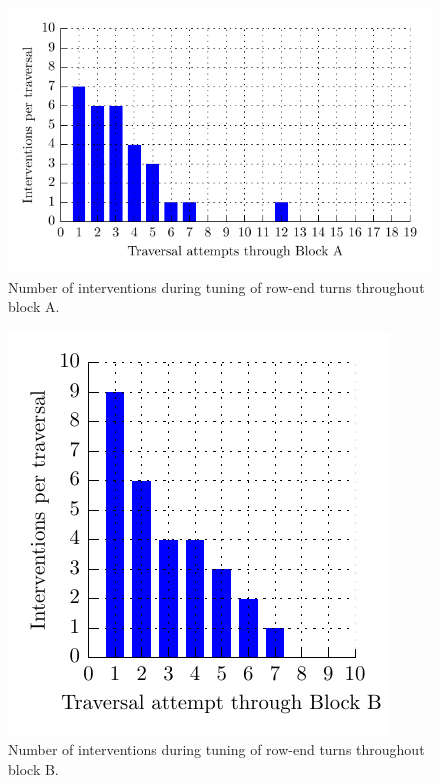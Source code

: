 \documentclass[preprint,authoryear,12pt]{elsarticle}
\begin{document}
    \begin{figure}[htb]
        \centering
        \includegraphics{images/bateman.pdf}
        \caption{
            Number of interventions during tuning of row-end turns throughout block A.
        }
        \label{fig:block_traversal_bateman}
    \end{figure}

    \begin{figure}[htb]
        \centering
        \includegraphics{images/newnham.pdf}
        \caption{
            Number of interventions during tuning of row-end turns throughout block B.
        }
        \label{fig:block_traversal_newnham}
    \end{figure}
\end{document}
